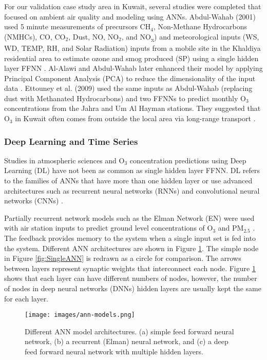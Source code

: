 For our validation case study area in Kuwait, several studies were completed that focused on ambient air quality and modeling using ANNs. Abdul-Wahab (2001) used 5 minute measurements of precursors CH$_{4}$, Non-Methane Hydrocarbons (NMHCs), CO, CO$_{2}$, Dust, NO, NO$_{2}$, and NO\textsubscript{x}) and meteorological inputs (WS, WD, TEMP, RH, and Solar Radiation) inputs from a mobile site in the Khaldiya residential area to estimate ozone and smog produced (SP)  using a single hidden layer FFNN \citep{AbdulWahab2001}. Al-Alawi and Abdul-Wahab later enhanced their model by applying Principal Component Analysis (PCA) to reduce the dimensionality of the input data \citep{AlAlawi2008}.  Ettouney et al. (2009) used the same inputs as Abdul-Wahab (replacing dust with Methanated Hydrocarbons) and two FFNNs to predict monthly O$_{3}$ concentrations from the Jahra and Um Al Hayman stations. They suggested that O$_{3}$ in Kuwait often comes from outside the local area via long-range transport \citep{Ettouney2009a}. 


\subsubsection{Deep Learning and Time Series}
Studies in atmospheric sciences and O$_{3}$ concentration predictions using Deep Learning (DL) have not been as common as single hidden layer FFNN. DL refers to the families of ANNs that have more than one hidden layer or use advanced architectures such as recurrent neural networks (RNNs) and convolutional neural networks (CNNs) \citep{Goodfellow2016}. 

Partially recurrent network models such as the Elman Network (EN) were used with air station inputs to predict ground level concentrations of O$_{3}$ \citep{Biancofiore2015} and PM$_{2.5}$ \citep{Biancofiore2017}. The feedback provides memory to the system when a single input set is fed into the system. Different ANN architectures are shown in Figure \ref{fig:ANNmodels}. The simple node in Figure \ref{fig:SingleANN} is redrawn as a circle for comparison.  The arrows between layers represent synaptic weights that interconnect each node. Figure \ref{fig:ANNmodels} shows that each layer can have different numbers of nodes, however, the number of nodes in deep neural networks (DNNs) hidden layers are usually kept the same for each layer.
%
\begin{figure}[H]
\centering
\texttt{[image: images/ann-models.png]} 
\caption[Different ANN model architectures.]{Different ANN model architectures. (a) simple feed forward neural network, (b) a recurrent (Elman) neural network, and (c) a deep feed forward neural network with multiple hidden layers.}
\label{fig:ANNmodels}
\end{figure}
%

